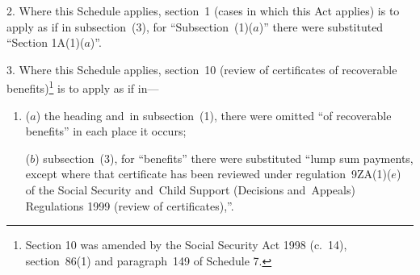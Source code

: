 \documentclass[12pt,a4paper]{article}
\begin{document}
2.  Where this Schedule applies, section~1 (cases in which this Act applies) is to apply as if in subsection~(3), for “Subsection~(1)($a$)” there were substituted “Section 1A(1)($a$)”.

\medskip

3.  Where this Schedule applies, section~10 (review of certificates of recoverable benefits)\footnote{Section 10 was amended by the Social Security Act 1998 (c.~14), section~86(1) and paragraph~149 of Schedule 7.} is to apply as if in—
\begin{enumerate}\item[]
($a$) the heading and~in subsection~(1), there were omitted “of recoverable benefits” in each place it occurs;

($b$) subsection~(3), for “benefits” there were substituted “lump sum payments, except where that certificate has been reviewed under regulation~9ZA(1)($e$)  of the Social Security and~Child Support (Decisions and~Appeals) Regulations 1999 (review of certificates),”.
\end{enumerate}

\medskip
\end{document}
